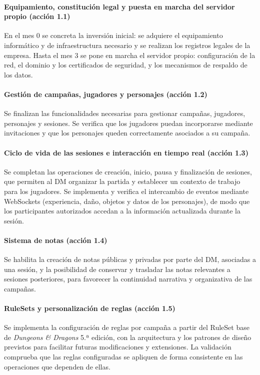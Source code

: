 \paragraph{Equipamiento, constitución legal y puesta en marcha del servidor propio (acción 1.1)}
En el mes 0 se concreta la inversión inicial: se adquiere el equipamiento informático y de infraestructura necesario y se realizan los registros legales de la empresa. Hasta el mes 3 se pone en marcha el servidor propio: configuración de la red, el dominio y los certificados de seguridad, y los mecanismos de respaldo de los datos.

\paragraph{Gestión de campañas, jugadores y personajes (acción 1.2)}
Se finalizan las funcionalidades necesarias para gestionar campañas, jugadores, personajes y sesiones. Se verifica que los jugadores puedan incorporarse mediante invitaciones y que los personajes queden correctamente asociados a su campaña.

\paragraph{Ciclo de vida de las sesiones e interacción en tiempo real (acción 1.3)}
Se completan las operaciones de creación, inicio, pausa y finalización de sesiones, que permiten al DM organizar la partida y establecer un contexto de trabajo para los jugadores. Se implementa y verifica el intercambio de eventos mediante WebSockets (experiencia, daño, objetos y datos de los personajes), de modo que los participantes autorizados accedan a la información actualizada durante la sesión.

\paragraph{Sistema de notas (acción 1.4)}
Se habilita la creación de notas públicas y privadas por parte del DM, asociadas a una sesión, y la posibilidad de conservar y trasladar las notas relevantes a sesiones posteriores, para favorecer la continuidad narrativa y organizativa de las campañas.

\paragraph{RuleSets y personalización de reglas (acción 1.5)}
Se implementa la configuración de reglas por campaña a partir del RuleSet base de \textit{Dungeons \& Dragons} 5.ª edición, con la arquitectura y los patrones de diseño previstos para facilitar futuras modificaciones y extensiones. La validación comprueba que las reglas configuradas se apliquen de forma consistente en las operaciones que dependen de ellas.

